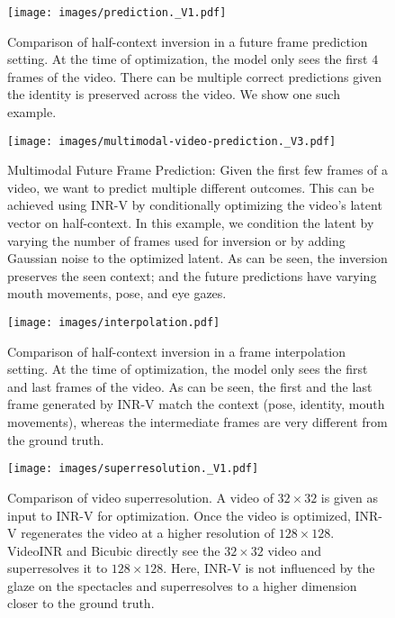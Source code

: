 \documentclass[10pt]{article} \usepackage[accepted]{tmlr}
\begin{document}
\begin{figure}[t]
  \centering
  \texttt{[image: images/prediction.\_V1.pdf]}
  \caption{Comparison of half-context inversion in a future frame prediction setting. At the time of optimization, the model only sees the first $4$ frames of the video. There can be multiple correct predictions given the identity is preserved across the video. We show one such example.}
  \label{fig:frame-prediction-appendix}
\end{figure}

\begin{figure}[t]
  \centering
  \texttt{[image: images/multimodal-video-prediction.\_V3.pdf]}
  \caption{Multimodal Future Frame Prediction: Given the first few frames of a video, we want to predict multiple different outcomes. This can be achieved using INR-V by conditionally optimizing the video's latent vector on half-context. In this example, we condition the latent by varying the number of frames used for inversion or by adding Gaussian noise to the optimized latent.
  As can be seen, the inversion preserves the seen context; and the future predictions have varying mouth movements, pose, and eye gazes.}
  \label{fig:multimodalframe-prediction-appendix}
\end{figure}

\begin{figure}[t]
  \centering
  \texttt{[image: images/interpolation.pdf]}
  \caption{Comparison of half-context inversion in a frame interpolation setting. At the time of optimization, the model only sees the first and last frames of the video. As can be seen, the first and the last frame generated by INR-V match the context (pose, identity, mouth movements), whereas the intermediate frames are very different from the ground truth.}
  \label{fig:frame-interpolation-appendix}
\end{figure}

\begin{figure}[t]
  \centering
  \texttt{[image: images/superresolution.\_V1.pdf]}
  \caption{Comparison of video superresolution. A video of $32\times32$ is given as input to INR-V for optimization. Once the video is optimized, INR-V regenerates the video at a higher resolution of $128\times128$. VideoINR and Bicubic directly see the $32\times32$ video and superresolves it to $128\times128$. Here, INR-V is not influenced by the glaze on the spectacles and superresolves to a higher dimension closer to the ground truth.}
  \label{fig:inversion-superresolution-appendix}
\end{figure}
\end{document}

